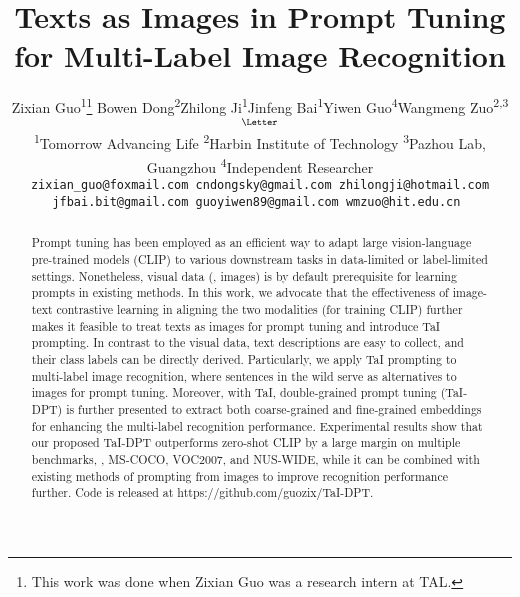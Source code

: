 \documentclass[10pt,twocolumn,letterpaper]{article}
\begin{document}
\title{Texts as Images in Prompt Tuning for Multi-Label Image Recognition}









\author{
  {\small Zixian Guo\textsuperscript{\rm 1}\thanks{This work was done when Zixian Guo was a research intern at TAL.} \quad Bowen Dong\textsuperscript{\rm 2}\quad Zhilong Ji\textsuperscript{\rm 1}\quad Jinfeng Bai\textsuperscript{\rm 1}\quad Yiwen Guo\textsuperscript{\rm 4}\quad  Wangmeng Zuo\textsuperscript{\rm 2,3}$^{\textrm{\Letter}}$} \\
  {\small \textsuperscript{\rm 1}Tomorrow Advancing Life \quad \textsuperscript{\rm 2}Harbin Institute of Technology \quad \textsuperscript{\rm 3}Pazhou Lab, Guangzhou \quad \textsuperscript{\rm 4}Independent Researcher}\\
  \tt{\small{zixian\_guo@foxmail.com \quad cndongsky@gmail.com \quad zhilongji@hotmail.com}} \\
  \tt{\small{jfbai.bit@gmail.com \quad guoyiwen89@gmail.com \quad wmzuo@hit.edu.cn}}
}

\maketitle







\begin{abstract}
    Prompt tuning has been employed as an efficient way to adapt large vision-language pre-trained models (\eg CLIP) to various downstream tasks in data-limited or label-limited settings. 
    Nonetheless, visual data (\eg, images) is by default prerequisite for learning prompts in existing methods.
In this work, we advocate that the effectiveness of image-text contrastive learning in aligning the two modalities (for training CLIP) further makes it feasible to treat texts as images for prompt tuning and introduce TaI prompting. 
    In contrast to the visual data, text descriptions are easy to collect, and their class labels can be directly derived.
    Particularly, we apply TaI prompting to multi-label image recognition, where sentences in the wild serve as alternatives to images for prompt tuning.
    Moreover, with TaI, double-grained prompt tuning (TaI-DPT) is further presented to extract both coarse-grained and fine-grained embeddings for enhancing the multi-label recognition performance.
    Experimental results show that our proposed TaI-DPT outperforms zero-shot CLIP by a large margin on multiple benchmarks, \eg, MS-COCO, VOC2007, and NUS-WIDE, while it can be combined with existing methods of prompting from images to improve recognition performance further.
    Code is released at https://github.com/guozix/TaI-DPT.


\end{abstract}
\end{document}
